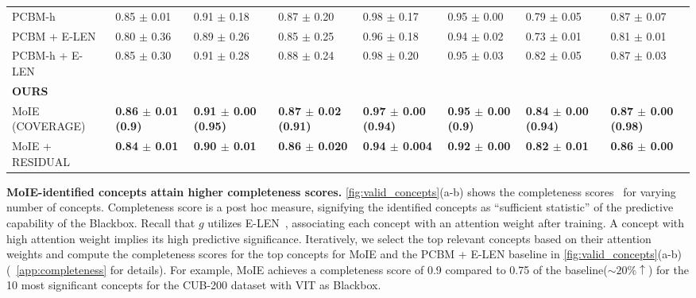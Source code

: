 \begin{table*}[t]
\begin{center}
\begin{tabular}{p{25.5em} p{7.5em} p{7.5em} p{7.5em} p{7.5em} p{7.5em} p{7.5em} p{7.5em}}
     PCBM-h~\cite{yuksekgonul2022post} & 0.85 $\pm$ 0.01  & 0.91 $\pm$ 0.18 & 0.87 $\pm$ 0.20 & 0.98 $\pm$ 0.17 &
     0.95 $\pm$	0.00 & 0.79 $\pm$	0.05 & 0.87 $\pm$	0.07\\
     PCBM + E-LEN~\cite{yuksekgonul2022post, barbiero2022entropy} &  0.80 $\pm$ 0.36 & 0.89 $\pm$ 0.26 & 0.85 $\pm$ 0.25 & 0.96 $\pm$ 0.18 & 
     0.94 $\pm$	0.02 &  0.73 $\pm$	0.01 & 0.81 $\pm$	0.01\\
     PCBM-h + E-LEN~\cite{yuksekgonul2022post, barbiero2022entropy} &  0.85 $\pm$ 0.30 & 0.91 $\pm$ 0.28 & 0.88 $\pm$ 0.24 & 0.98 $\pm$ 0.20 & 
     0.95 $\pm$	0.03 &  0.82 $\pm$	0.05 & 0.87 $\pm$	0.03\\
\midrule
     \textbf{OURS} \\
     MoIE (COVERAGE) &\textbf{0.86 $\pm$ 0.01 (0.9)} &\textbf{0.91 $\pm$ 0.00 (0.95)} &
     \textbf{0.87 $\pm$ 0.02 (0.91)} & \textbf{0.97 $\pm$ 0.00 (0.94)} & \textbf{0.95 $\pm$	0.00 (0.9)}
     & \textbf{0.84 $\pm$ 0.00 (0.94)} & \textbf{0.87 $\pm$	0.00 (0.98)}\\
     MoIE + RESIDUAL & \textbf{0.84 $\pm$ 0.01} & \textbf{0.90 $\pm$ 0.01} & \textbf{0.86 $\pm$ 0.020} & \textbf{0.94 $\pm$ 0.004}
     & \textbf{0.92 $\pm$	0.00} & \textbf{0.82 $\pm$	0.01} & \textbf{0.86 $\pm$	0.00} \\
\bottomrule
\end{tabular}
\end{center}
\end{table*}

\textbf{MoIE-identified concepts attain higher completeness scores.} 
\cref{fig:valid_concepts}(a-b) shows the completeness scores~\cite{yeh2019concept} for varying number of concepts.
 Completeness score is a post hoc measure, signifying the identified concepts as ``sufficient statistic'' of the predictive capability of the Blackbox. Recall that $g$ utilizes E-LEN~\cite{barbiero2022entropy}, associating each concept with an attention weight after training. A concept with high attention weight implies its high predictive significance.
 Iteratively, we select the top relevant concepts based on their attention weights and compute the completeness scores for the top concepts for MoIE and the PCBM + E-LEN baseline in \cref{fig:valid_concepts}(a-b) (~\cref{app:completeness} for details).
 For example, MoIE achieves a completeness score of 0.9 compared to 0.75 of the baseline($\sim 20\%\uparrow$) for the 10 most significant concepts for the CUB-200 dataset with VIT as Blackbox.
 
